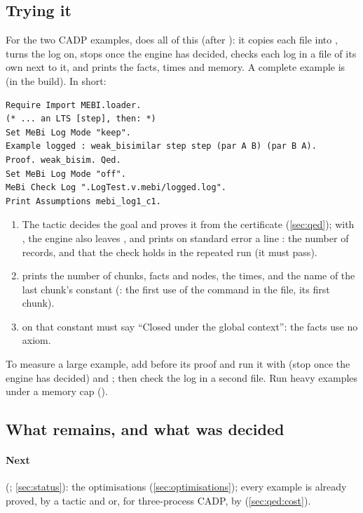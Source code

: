 \subsection{Trying it}\label{sec:prooflog:try}

For the two CADP examples,  does all of this
(after ): it copies each file into ,
turns the log on, stops once the engine has decided, checks each log in a
file of its own next to it, and prints the facts, times and memory. A
complete example is  (in the build). In short:
\begin{verbatim}
Require Import MEBI.loader.
(* ... an LTS [step], then: *)
Set MeBi Log Mode "keep".
Example logged : weak_bisimilar step step (par A B) (par B A).
Proof. weak_bisim. Qed.
Set MeBi Log Mode "off".
MeBi Check Log ".LogTest.v.mebi/logged.log".
Print Assumptions mebi_log1_c1.
\end{verbatim}
\begin{enumerate}
\item The tactic decides the goal and proves it from the certificate
  (\cref{sec:qed}); with , the engine also leaves
  , and prints on standard error a line
  : the
  number of records, and that the check holds in the repeated run (it
  must pass).
\item {} prints the number of chunks, facts and nodes,
  the times, and the name of the last chunk's constant
  (: the first use of the command in the file, its
  first chunk).
\item {} on that constant must say ``Closed under the
  global context'': the facts use no axiom.
\end{enumerate}
To measure a large example, add  before its
proof and run it with  (stop once the engine
has decided) and ; then check the log in a second
file. Run heavy examples under a memory cap ().

\subsection{What remains, and what was decided}\label{sec:prooflog:next}

\paragraph{Next} (; \cref{sec:status}): the
optimisations (\cref{sec:optimisations}); every example is already
proved, by a tactic and  or, for three-process CADP, by
 (\cref{sec:qed:cost}).

